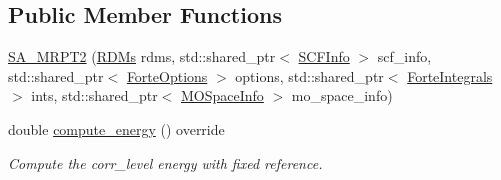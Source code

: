 \subsection*{Public Member Functions}
\begin{DoxyCompactItemize}
\item 
\mbox{\hyperlink{classforte_1_1_s_a___m_r_p_t2_a14395e3547bb4ada71c71d0ed0ffe7ae}{S\+A\+\_\+\+M\+R\+P\+T2}} (\mbox{\hyperlink{classforte_1_1_r_d_ms}{R\+D\+Ms}} rdms, std\+::shared\+\_\+ptr$<$ \mbox{\hyperlink{classforte_1_1_s_c_f_info}{S\+C\+F\+Info}} $>$ scf\+\_\+info, std\+::shared\+\_\+ptr$<$ \mbox{\hyperlink{classforte_1_1_forte_options}{Forte\+Options}} $>$ options, std\+::shared\+\_\+ptr$<$ \mbox{\hyperlink{classforte_1_1_forte_integrals}{Forte\+Integrals}} $>$ ints, std\+::shared\+\_\+ptr$<$ \mbox{\hyperlink{classforte_1_1_m_o_space_info}{M\+O\+Space\+Info}} $>$ mo\+\_\+space\+\_\+info)
\item 
double \mbox{\hyperlink{classforte_1_1_s_a___m_r_p_t2_ac9a4af8ba06295c2918dbc2640caab85}{compute\+\_\+energy}} () override
\begin{DoxyCompactList}\small\item\em Compute the corr\+\_\+level energy with fixed reference. \end{DoxyCompactList}\end{DoxyCompactItemize}
